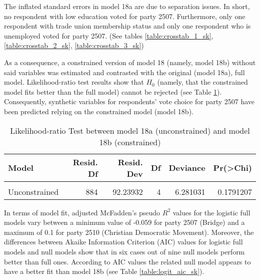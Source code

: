 \documentclass[
]{article}
\begin{document}
The inflated standard errors in model 18a are due to separation issues. In short, no respondent with low education voted for party 2507. Furthermore, only one respondent with trade union membership status and only one respondent who is unemployed voted for party 2507. (See tables \ref{table:crosstab_1_sk}, \ref{table:crosstab_2_sk}, \ref{table:crosstab_3_sk})

As a consequence, a constrained version of model 18 (namely, model 18b) without said variables was
estimated and contrasted with the original (model 18a), full model. Likelihood-ratio test results show
that \(H_0\) (namely, that the constrained model fits better than the full model) cannot be rejected
(see Table \ref{table:lrtest_1_sk}). Consequently, synthetic variables for respondents' vote choice for
party 2507 have been predicted relying on the constrained model (model 18b).

\begin{table}[!h]

\caption{\label{tab:unnamed-chunk-157}Likelihood-ratio Test between model 18a (unconstrained) and model 18b (constrained)
                  \label{table:lrtest_1_sk}}
\centering
\begin{tabular}[t]{l|r|r|r|r|r}
\hline
Model & Resid. Df & Resid. Dev & Df & Deviance & Pr(>Chi)\\
\hline
\cellcolor{gray!6}{Constrained} & \cellcolor{gray!6}{888} & \cellcolor{gray!6}{98.52036} & \cellcolor{gray!6}{} & \cellcolor{gray!6}{} & \cellcolor{gray!6}{}\\
\hline
Unconstrained & 884 & 92.23932 & 4 & 6.281031 & 0.1791207\\
\hline
\end{tabular}
\end{table}

In terms of model fit, adjusted McFadden's pseudo \(R^2\) values for the logistic full models vary between
a minimum value of
-0.059
for party 2507
(Bridge)
and a maximum of
0.1
for party 2510
(Christian Democratic Movement).
Moreover, the differences between Akaike Information Criterion (AIC) values for logistic full models and
null models show that in six cases out of nine null models perform better than full ones. According to AIC
values the related null model appears to have a better fit than model 18b (see Table \ref{table:logit_aic_sk}).
\end{document}
